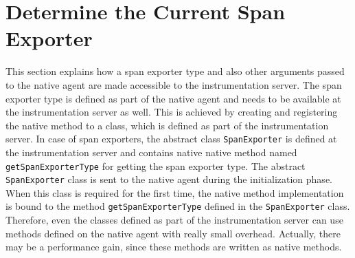 \section{Determine the Current Span Exporter}
This section explains how a span exporter type and also other arguments passed to the native agent are made accessible to the instrumentation server. The span exporter type is defined as part of the native agent and needs to be available at the instrumentation server as well. This is achieved by creating and registering the native method to a class, which is defined as part of the instrumentation server.
In case of span exporters, the abstract class \texttt{SpanExporter} is defined at the instrumentation server and contains native native method named \texttt{getSpanExporterType} for getting the span exporter type. The abstract \texttt{SpanExporter} class is sent to the native agent during the initialization phase. When this class is required for the first time, the native method implementation is bound to the method \texttt{getSpanExporterType} defined in the \texttt{SpanExporter} class. Therefore, even the classes defined as part of the instrumentation server can use methods defined on the native agent with really small overhead. Actually, there may be a performance gain, since these methods are written as native methods.



